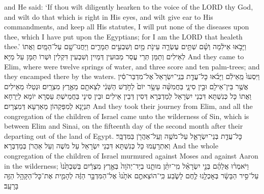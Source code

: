 {{and He said: ‘If thou wilt diligently hearken to the voice of the LORD thy God, and wilt do that which is right in His eyes, and wilt give ear to His commandments, and keep all His statutes, I will put none of the diseases upon thee, which I have put upon the Egyptians; for I am the LORD that healeth thee.’}{}
{וַיָּבֹ֣אוּ אֵילִ֔מָה וְשָׁ֗ם שְׁתֵּ֥ים עֶשְׂרֵ֛ה עֵינֹ֥ת מַ֖יִם וְשִׁבְעִ֣ים תְּמָרִ֑ים וַיַּחֲנוּ־שָׁ֖ם עַל־הַמָּֽיִם׃
}
{וַאֲתוֹ לְאֵילִים וְתַמָּן תְּרֵי עֲסַר מַבּוּעִין דְּמַיִין וְשִׁבְעִין דִּקְלִין וּשְׁרוֹ תַּמָּן עַל מַיָּא׃}
{And they came to Elim, where were twelve springs of water, and three score and ten palm-trees; and they encamped there by the waters.}{}
\newperek
{}%
{וַיִּסְעוּ֙ מֵֽאֵילִ֔ם וַיָּבֹ֜אוּ כׇּל־עֲדַ֤ת בְּנֵֽי־יִשְׂרָאֵל֙ אֶל־מִדְבַּר־סִ֔ין אֲשֶׁ֥ר בֵּין־אֵילִ֖ם וּבֵ֣ין סִינָ֑י בַּחֲמִשָּׁ֨ה עָשָׂ֥ר יוֹם֙ לַחֹ֣דֶשׁ הַשֵּׁנִ֔י לְצֵאתָ֖ם מֵאֶ֥רֶץ מִצְרָֽיִם׃
}
{וּנְטַלוּ מֵאֵילִים וַאֲתוֹ כָּל כְּנִשְׁתָּא דִּבְנֵי יִשְׂרָאֵל לְמַדְבְּרָא דְּסִין דְּבֵין אֵילִים וּבֵין סִינָי בַּחֲמֵישְׁתְּ עַסְרָא יוֹמָא לְיַרְחָא תִּנְיָנָא לְמִפַּקְהוֹן מֵאַרְעָא דְּמִצְרָיִם׃}
{And they took their journey from Elim, and all the congregation of the children of Israel came unto the wilderness of Sin, which is between Elim and Sinai, on the fifteenth day of the second month after their departing out of the land of Egypt.}{}
{ כׇּל־עֲדַ֧ת בְּנֵי־יִשְׂרָאֵ֛ל עַל־מֹשֶׁ֥ה וְעַֽל־אַהֲרֹ֖ן בַּמִּדְבָּֽר׃
}
{וְאִתְרָעַמוּ כָּל כְּנִשְׁתָּא דִּבְנֵי יִשְׂרָאֵל עַל מֹשֶׁה וְעַל אַהֲרֹן בְּמַדְבְּרָא׃}
{And the whole congregation of the children of Israel murmured against Moses and against Aaron in the wilderness;}{}
{וַיֹּאמְר֨וּ אֲלֵהֶ֜ם בְּנֵ֣י יִשְׂרָאֵ֗ל מִֽי־יִתֵּ֨ן מוּתֵ֤נוּ בְיַד־יְהֹוָה֙ בְּאֶ֣רֶץ מִצְרַ֔יִם בְּשִׁבְתֵּ֙נוּ֙ עַל־סִ֣יר הַבָּשָׂ֔ר בְּאׇכְלֵ֥נוּ לֶ֖חֶם לָשֹׂ֑בַע כִּֽי־הוֹצֵאתֶ֤ם אֹתָ֙נוּ֙ אֶל־הַמִּדְבָּ֣ר הַזֶּ֔ה לְהָמִ֛ית אֶת־כׇּל־הַקָּהָ֥ל הַזֶּ֖ה בָּרָעָֽב׃ \setuma         
}
}
